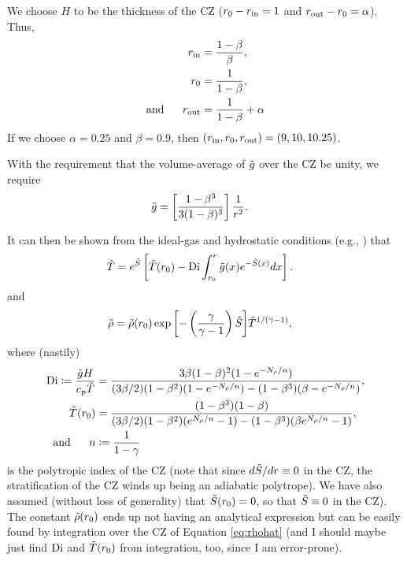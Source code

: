 \documentclass[12pt]{article}
\numberwithin{equation}{section}
\begin{document}
We choose $H$ to be the thickness of the CZ ($r_0-r_{\rm{in}}=1$ and $r_{\rm{out}}-r_0=\alpha$). Thus,
\begin{subequations}
	\begin{align}
		r_{\rm{in}} &=\frac{1-\beta}{\beta},\\
		r_0 &= \frac{1}{1-\beta},\\
		\text{and}\ \ \ \ \  r_{\rm{out}} &=  \frac{1}{1-\beta} + \alpha
	\end{align}
\end{subequations}
If we choose $\alpha=0.25$ and $\beta=0.9$, then $(r_{\rm{in}},r_0,r_{\rm{out}})=(9, 10, 10.25)$. 

With the requirement that the volume-average of $\tilde{g}$ over the CZ be unity, we require
\begin{align}
	\tilde{g} &= \left[ \frac{1-\beta^3}{3(1-\beta)^3}    \right]\frac{1}{r^2}.
\end{align}

It can then be shown from the ideal-gas and hydrostatic conditions (e.g., \citealt{Matilsky2023d}) that
\begin{align}\label{eq:tmphat}
	\tilde{T} &= e^{\tilde{S}}\left[\tilde{T}(r_0) - {\rm{Di}}\int_{r_0}^r \tilde{g}(x)  e^{-\tilde{S}(x)}dx\right].
\end{align}
and
\begin{align}\label{eq:rhohat}
	\tilde{\rho} &= \tilde{\rho}(r_0) \exp{\left[-\left(\frac{\gamma}{\gamma-1}\right)\tilde{S}\right]}\tilde{T}^{1/(\gamma-1)},
\end{align}
where (nastily)
\begin{align}\label{eq:digory}
	{\rm{Di}} \coloneqq \frac{\tilde{g}H}{c_{\rm{p}}\tilde{T}} &=  \frac{3 \beta (1 - \beta)^2 (1 - e^{-N_\rho/n})} 
	{ (3\beta/2) (1 - \beta^2) (1 - e^{-N_\rho/n}) - (1-\beta^3)(\beta-e^{-N_\rho/n})},\\
	\tilde{T}(r_0)&= \frac{(1-\beta^3)(1-\beta)}{(3\beta/2)(1-\beta^2)(e^{N_\rho/n}-1) - (1-\beta^3)(\beta e^{N_\rho/n}-1)},\\
	\text{and}\ \ \ \ \  n &\coloneqq \frac{1}{1-\gamma}
\end{align}
is the polytropic index of the CZ (note that since $d\tilde{S}/dr\equiv0$ in the CZ, the stratification of the CZ winds up being an adiabatic polytrope). We have also assumed (without loss of generality) that $\tilde{S}(r_0)=0$, so that $\tilde{S}\equiv0$ in the CZ). The constant $\tilde{\rho}(r_0)$ ends up not having an analytical expression but can be easily found by integration over the CZ of Equation \eqref{eq:rhohat} (and I should maybe just find ${\rm{Di}}$ and $\tilde{T}(r_0)$ from integration, too, since I am error-prone).  
\end{document}

